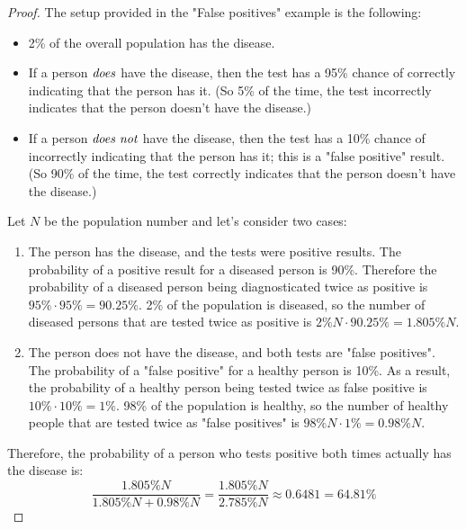 \begin{proof}
    The setup provided in the "False positives" example is the following:
    \begin{itemize}
        \item 2\% of the overall population has the disease.

        \item If a person $\emph{does}$ have the disease, then the test has a 95\% chance of correctly
            indicating that the person has it. (So 5\% of the time, the test incorrectly indicates
            that the person doesn't have the disease.)

        \item If a person $\emph{does not}$ have the disease, then the test has a 10\% chance of
            incorrectly indicating that the person has it; this is a "false positive" result.
            (So 90\% of the time, the test correctly indicates that the person doesn't have the 
            disease.)
    \end{itemize}

    Let $N$ be the population number and let's consider two cases:
    \begin{enumerate}
        \item The person has the disease, and the tests were positive results.
            The probability of a positive result for a diseased person is 90\%.
            Therefore the probability of a diseased person being diagnosticated twice
            as positive is $95\% \cdot 95\% = 90.25\%$. 2\% of the population is diseased,
            so the number of diseased persons that are tested twice as positive is 
            $2\%N \cdot 90.25\% = 1.805\%N$.

        \item The person does not have the disease, and both tests are "false positives".
            The probability of a "false positive" for a healthy person is 10\%.
            As a result, the probability of a healthy person being tested twice as false positive
            is $10\% \cdot 10\% = 1\%$. 98\% of the population is healthy, so the number
            of healthy people that are tested twice as "false positives" is 
            $98\%N \cdot 1\% = 0.98\%N$.
    \end{enumerate}

    Therefore, the probability of a person who tests positive both times actually has the disease
    is:
    \[
        \frac{1.805\%N}{1.805\%N + 0.98\%N} = \frac{1.805\%N}{2.785\%N} \approx 0.6481 = 64.81\%
    \] 
\end{proof}
